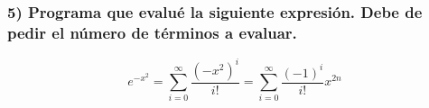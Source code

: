 \subsubsection*{5) Programa que evalué la siguiente expresión. Debe de pedir el número de términos a evaluar.}
\begin{equation*}
    e^{-x^2} = \sum_{i=0}^\infty \frac{(-x^2)^i}{i!} = \sum_{i=0}^\infty \frac{(-1)^i}{i!} x^{2n}
\end{equation*}